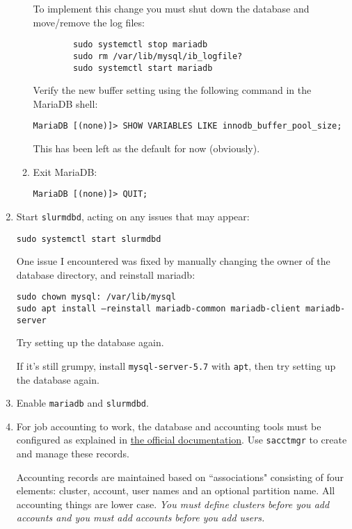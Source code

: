 \begin{enumerate}
\begin{enumerate}
		To implement this change you must shut down the database and move/remove the log files:

		\begin{verbatim}
		sudo systemctl stop mariadb
		sudo rm /var/lib/mysql/ib_logfile?
		sudo systemctl start mariadb
		\end{verbatim}

		Verify the new buffer setting using the following command in the MariaDB shell:

		\texttt{MariaDB [(none)]> SHOW VARIABLES LIKE innodb\_buffer\_pool\_size;}

		This has been left as the default for now (obviously).

	\item Exit MariaDB:

		\texttt{MariaDB [(none)]> QUIT;}
	\end{enumerate}

\item Start \texttt{slurmdbd}, acting on any issues that may appear:

	\texttt{sudo systemctl start slurmdbd}

	One issue I encountered was fixed by manually changing the owner of the database directory, and reinstall mariadb:
	
	\texttt{sudo chown mysql: /var/lib/mysql} \\
	\texttt{sudo apt install --reinstall mariadb-common mariadb-client mariadb-server}
	
	Try setting up the database again.

	If it's still grumpy, install \texttt{mysql-server-5.7} with \texttt{apt}, then try setting up the database again.

\item Enable \texttt{mariadb} and \texttt{slurmdbd}.


\item For job accounting to work, the database and accounting tools must be configured as explained in \href{https://slurm.schedmd.com/accounting.html#database-configuration}{the official documentation}. Use \texttt{sacctmgr} to create and manage these records.

Accounting records are maintained based on ``associations" consisting of four elements: cluster, account, user names and an optional partition name. All accounting things are lower case. \emph{You must define clusters before you add accounts and you must add accounts before you add users.}


\end{enumerate}
